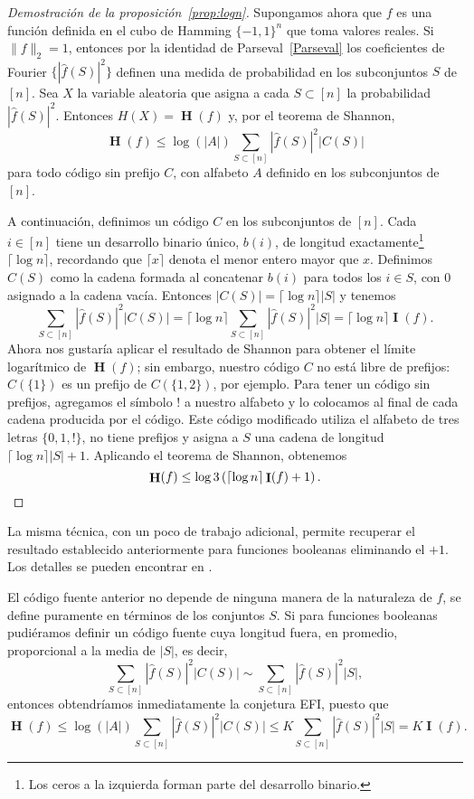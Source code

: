\documentclass[autocontact]{gaceta}
\DeclareMathOperator{\II}{\mathbf{I}}
\DeclareMathOperator{\HH}{\mathbf{H}}
\begin{document}
\begin{proof}[Demostración de la proposición~\ref{prop:logn}]
Supongamos ahora que $f$ es una función definida en el cubo de Hamming $\{-1, 1\}^n$ que toma valores reales. Si $\|f\|_2 = 1$, entonces por la identidad de Parseval~\eqref{Parseval} los coeficientes de Fourier $\{|\widehat{f}(S)|^2\}$ definen una medida de probabilidad en los subconjuntos $S$ de $[n]$. Sea $X$ la variable aleatoria que asigna a cada $S\subset [n]$ la probabilidad $|\widehat{f}(S)|^2$. Entonces $H(X)=\HH(f)$ y, por el teorema de Shannon,
\[
\HH(f)\leq \log (|A|) \sum_{S\subset [n]} |\widehat{f}(S)|^2 |C(S)|
\]
para todo código sin prefijo $C$, con alfabeto $A$ definido en los subconjuntos de $[n]$.

A continuación, definimos un código $C$ en los subconjuntos de $[n]$. Cada $i\in [n]$ tiene un desarrollo binario único, $b(i)$, de longitud exactamente\footnote{Los ceros a la izquierda forman parte del desarrollo binario.} $\lceil\log n\rceil$, recordando que $\lceil x\rceil$ denota el menor entero mayor que $x$. Definimos $C(S)$ como la cadena formada al concatenar $b(i)$ para todos los $i\in S$, con $0$ asignado a la cadena vacía. Entonces $|C(S)| = \lceil\log n\rceil |S|$ y tenemos
\[
   \sum_{S\subset [n]} |\widehat{f}(S)|^2 |C(S)|
   = \lceil\log n\rceil \sum_{S\subset [n]} |\widehat{f}(S)|^2 |S|
   = \lceil\log n\rceil \II(f).
\]
Ahora nos gustaría aplicar el resultado de Shannon para obtener el límite logarítmico de $\HH(f)$; sin embargo, nuestro código $C$ no está libre de prefijos: $C(\{1\})$ es un prefijo de $C( \{1,2\})$, por ejemplo. Para tener un código sin prefijos, agregamos el símbolo $!$ a nuestro alfabeto y lo colocamos al final de cada cadena producida por el código. Este código modificado utiliza el alfabeto de tres letras $\{0,1,! \}$, no tiene prefijos y asigna a $S$ una cadena de longitud $\lceil\log n\rceil |S| + 1$. Aplicando el teorema de Shannon, obtenemos
\[
\HH(f)\leq \log 3 \left(\lceil\log n\rceil \II(f) + 1 \right).
\qedhere
\]
\end{proof}

La misma técnica, con un poco de trabajo adicional, permite recuperar el resultado establecido anteriormente para funciones booleanas eliminando el $+1$. Los detalles se pueden encontrar en \cite{WWW14}.

El código fuente anterior no depende de ninguna manera de la naturaleza de $f$, se define puramente en términos de los conjuntos $S$. Si para funciones booleanas pudiéramos definir un código fuente cuya longitud fuera, en promedio, proporcional a la media de $|S|$, es decir,
\[
   \sum_{S\subset [n]} |\widehat{f}(S)|^2 |C(S)|
   \sim \sum_{S\subset [n]} |\widehat{f}(S)|^2 |S|,
\]
entonces obtendríamos inmediatamente la conjetura EFI, puesto que
\[
   \HH(f)
   \leq \log (|A|) \sum_{S\subset [n]} |\widehat{f}(S)|^2 |C(S)|
   \leq K \sum_{S\subset [n]} |\widehat{f}(S)|^2 |S|
   = K \II(f).
\]
\end{document}

